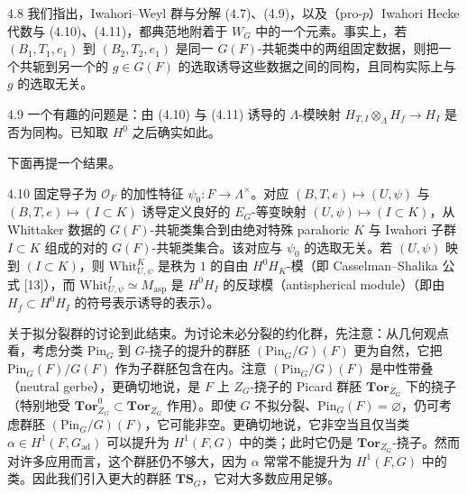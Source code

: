 \begin{rem}{4.8}
我们指出，Iwahori–Weyl 群与分解 (4.7)、(4.9)，以及（pro-$p$）Iwahori Hecke 代数与 (4.10)、(4.11)，都典范地附着于 $W_G$ 中的一个元素。事实上，若 $(B_1,T_1,e_1)$ 到 $(B_2,T_2,e_1)$ 是同一 $G(F)$-共轭类中的两组固定数据，则把一个共轭到另一个的 $g\in G(F)$ 的选取诱导这些数据之间的同构，且同构实际上与 $g$ 的选取无关。
\end{rem}

\begin{rem}{4.9}
一个有趣的问题是：由 (4.10) 与 (4.11) 诱导的 $\Lambda$-模映射 $H_{T,I}\otimes_\Lambda H_f\to H_I$ 是否为同构。已知取 $H^0$ 之后确实如此。
\end{rem}

下面再提一个结果。

\begin{prop}{4.10}
固定导子为 $\mathcal{O}_F$ 的加性特征 $\psi_0:F\to\Lambda^\times$。对应 $(B,T,e)\mapsto(U,\psi)$ 与 $(B,T,e)\mapsto(I\subset K)$ 诱导定义良好的 $E_G$-等变映射 $(U,\psi)\mapsto(I\subset K)$，从 Whittaker 数据的 $G(F)$-共轭类集合到由绝对特殊 parahoric $K$ 与 Iwahori 子群 $I\subset K$ 组成的对的 $G(F)$-共轭类集合。该对应与 $\psi_0$ 的选取无关。若 $(U,\psi)$ 映到 $(I\subset K)$，则 $\mathrm{Whit}_{U,\psi}^K$ 是秩为 $1$ 的自由 $H^0H_K$-模（即 Casselman–Shalika 公式 [13]），而 $\mathrm{Whit}_{U,\psi}^I\simeq M_{\mathrm{asp}}$ 是 $H^0H_I$ 的反球模（antispherical module）（即由 $H_f\subset H^0H_I$ 的符号表示诱导的表示）。
\end{prop}

关于拟分裂群的讨论到此结束。为讨论未必分裂的约化群，先注意：从几何观点看，考虑分类 $\mathrm{Pin}_G$ 到 $G$-挠子的提升的群胚 $(\mathrm{Pin}_G/G)(F)$ 更为自然，它把 $\mathrm{Pin}_G(F)/G(F)$ 作为子群胚包含在内。注意 $(\mathrm{Pin}_G/G)(F)$ 是中性带叠（neutral gerbe），更确切地说，是 $F$ 上 $Z_G$-挠子的 Picard 群胚 $\mathbf{Tor}_{Z_G}$ 下的挠子（特别地受 $\mathbf{Tor}^0_{Z_G}\subset\mathbf{Tor}_{Z_G}$ 作用）。即使 $G$ 不拟分裂、$\mathrm{Pin}_G(F)=\varnothing$，仍可考虑群胚 $(\mathrm{Pin}_G/G)(F)$，它可能非空。更确切地说，它非空当且仅当类 $\alpha\in H^1(F,G_{\mathrm{ad}})$ 可以提升为 $H^1(F,G)$ 中的类；此时它仍是 $\mathbf{Tor}_{Z_G}$-挠子。然而对许多应用而言，这个群胚仍不够大，因为 $\alpha$ 常常不能提升为 $H^1(F,G)$ 中的类。因此我们引入更大的群胚 $\mathbf{TS}_G$，它对大多数应用足够。

